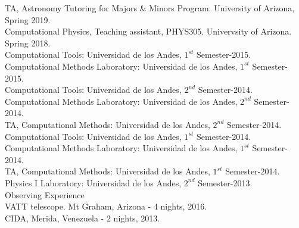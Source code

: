 \documentclass[UTF8]{article}
\begin{document}
\indent\indent TA, Astronomy Tutoring for
Majors \& Minors Program. University of Arizona, Spring 2019. \\
\indent\indent Computational Physics, Teaching assistant, PHYS305. Univervsity of Arizona. Spring 2018.\\
\indent\indent Computational Tools: Universidad de los Andes, $1^{st}$ Semester-2015.\\
\indent\indent Computational Methods Laboratory: Universidad de los Andes, $1^{st}$ Semester-2015.\\
\indent\indent Computational Tools: Universidad de los Andes, $2^{nd}$ Semester-2014.\\
\indent\indent Computational Methods Laboratory: Universidad de los Andes, $2^{nd}$ Semester-2014.\\
\indent\indent TA, Computational Methods: Universidad de los Andes, $2^{nd}$ Semester-2014.\\
\indent\indent Computational Tools: Universidad de los Andes, $1^{st}$ Semester-2014.\\
\indent\indent Computational Methods Laboratory: Universidad de los Andes, $1^{st}$ Semester-2014.\\
\indent\indent TA, Computational Methods: Universidad de los Andes, $1^{st}$ Semester-2014.\\
\indent\indent Physics I Laboratory: Universidad de los Andes, $2^{nd}$ Semester-2013.\\


{\Large Observing Experience}\\

\indent\indent VATT telescope. Mt Graham, Arizona - 4 nights, 2016.\\
\indent\indent CIDA, Merida, Venezuela - 2 nights, 2013.\\







\end{document}
